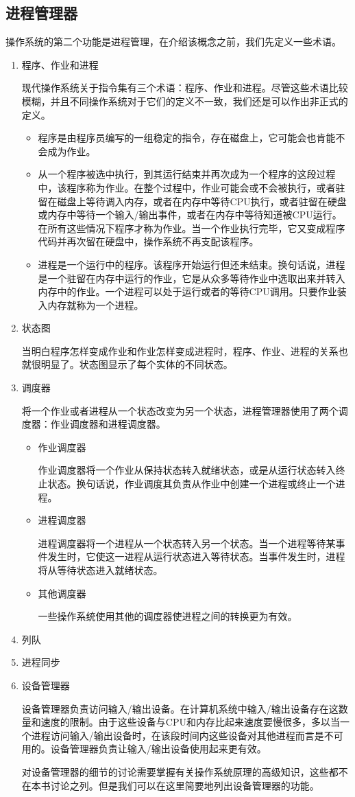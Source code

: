 \subsection{进程管理器}
操作系统的第二个功能是进程管理，在介绍该概念之前，我们先定义一些术语。
\begin{enumerate}
	\item 程序、作业和进程

	现代操作系统关于指令集有三个术语：程序、作业和进程。尽管这些术语比较模糊，并且不同操作系统对于它们的定义不一致，我们还是可以作出非正式的定义。
	\begin{itemize}
		\item 程序是由程序员编写的一组稳定的指令，存在磁盘上，它可能会也肯能不会成为作业。
		\item 从一个程序被选中执行，到其运行结束并再次成为一个程序的这段过程中，该程序称为作业。在整个过程中，作业可能会或不会被执行，或者驻留在磁盘上等待调入内存，或者在内存中等待CPU执行，或者驻留在硬盘或内存中等待一个输入/输出事件，或者在内存中等待知道被CPU运行。在所有这些情况下程序才称为作业。当一个作业执行完毕，它又变成程序代码并再次留在硬盘中，操作系统不再支配该程序。
		\item 进程是一个运行中的程序。该程序开始运行但还未结束。换句话说，进程是一个驻留在内存中运行的作业，它是从众多等待作业中选取出来并转入内存中的作业。一个进程可以处于运行或者的等待CPU调用。只要作业装入内存就称为一个进程。
	\end{itemize}
	\item 状态图

	当明白程序怎样变成作业和作业怎样变成进程时，程序、作业、进程的关系也就很明显了。状态图显示了每个实体的不同状态。
	\item 调度器

	将一个作业或者进程从一个状态改变为另一个状态，进程管理器使用了两个调度器：作业调度器和进程调度器。
	\begin{itemize}
		\item 作业调度器

		作业调度器将一个作业从保持状态转入就绪状态，或是从运行状态转入终止状态。换句话说，作业调度其负责从作业中创建一个进程或终止一个进程。
		\item 进程调度器

		进程调度器将一个进程从一个状态转入另一个状态。当一个进程等待某事件发生时，它使这一进程从运行状态进入等待状态。当事件发生时，进程将从等待状态进入就绪状态。
		\item 其他调度器

		一些操作系统使用其他的调度器使进程之间的转换更为有效。
	\end{itemize}
	\item 列队
	\item 进程同步
	\item 设备管理器

	设备管理器负责访问输入/输出设备。在计算机系统中输入/输出设备存在这数量和速度的限制。由于这些设备与CPU和内存比起来速度要慢很多，多以当一个进程访问输入/输出设备时，在该段时间内这些设备对其他进程而言是不可用的。设备管理器负责让输入/输出设备使用起来更有效。

	对设备管理器的细节的讨论需要掌握有关操作系统原理的高级知识，这些都不在本书讨论之列。但是我们可以在这里简要地列出设备管理器的功能。
\end{enumerate}

